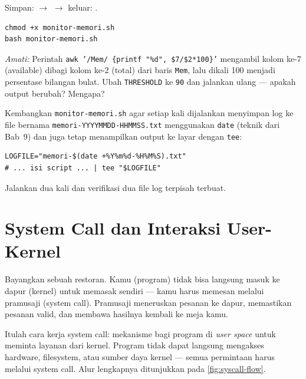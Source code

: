 \begin{notebox}
Simpan:  $\to$  $\to$ keluar: .
\end{notebox}

\begin{lstlisting}[caption={Jalankan script monitor}]
chmod +x monitor-memori.sh
bash monitor-memori.sh
\end{lstlisting}

\textit{Amati:} Perintah \texttt{awk '/Mem/ \{printf "\%d", \$7/\$2*100\}'} mengambil
kolom ke-7 (available) dibagi kolom ke-2 (total) dari baris \texttt{Mem}, lalu dikali
100 menjadi persentase bilangan bulat. Ubah \texttt{THRESHOLD} ke \texttt{90} dan
jalankan ulang --- apakah output berubah? Mengapa?

\begin{challengebox}
Kembangkan \texttt{monitor-memori.sh} agar setiap kali dijalankan menyimpan log
ke file bernama \texttt{memori-YYYYMMDD-HHMMSS.txt} menggunakan \texttt{date}
(teknik dari Bab~9) dan juga tetap menampilkan output ke layar dengan \texttt{tee}:
\begin{lstlisting}
LOGFILE="memori-$(date +%Y%m%d-%H%M%S).txt"
# ... isi script ... | tee "$LOGFILE"
\end{lstlisting}
Jalankan dua kali dan verifikasi dua file log terpisah terbuat.
\end{challengebox}

\section{System Call dan Interaksi User-Kernel}

Bayangkan sebuah restoran. Kamu (program) tidak bisa langsung masuk ke dapur (kernel)
untuk memasak sendiri --- kamu harus memesan melalui pramusaji (system call).
Pramusaji meneruskan pesanan ke dapur, memastikan pesanan valid, dan membawa hasilnya
kembali ke meja kamu.

Itulah cara kerja system call: mekanisme bagi program di \textit{user space} untuk
meminta layanan dari kernel. Program tidak dapat langsung mengakses hardware,
filesystem, atau sumber daya kernel --- semua permintaan harus melalui system call.
Alur lengkapnya ditunjukkan pada \cref{fig:syscall-flow}.

